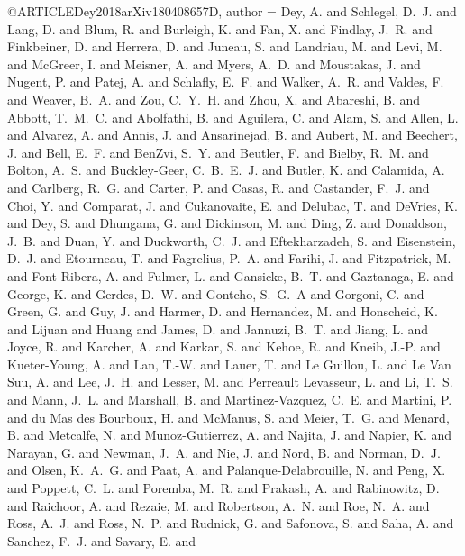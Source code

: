 \documentclass[twocolumn]{aastex62}
\begin{document}
{{{{{{{{{{{{{{{{{{{{{{{{{{{{{{{{{{{{{{{{{{{{{{{{{{{{@ARTICLE{Dey2018arXiv180408657D,
   author = {{Dey}, A. and {Schlegel}, D.~J. and {Lang}, D. and {Blum}, R. and 
	{Burleigh}, K. and {Fan}, X. and {Findlay}, J.~R. and {Finkbeiner}, D. and 
	{Herrera}, D. and {Juneau}, S. and {Landriau}, M. and {Levi}, M. and 
	{McGreer}, I. and {Meisner}, A. and {Myers}, A.~D. and {Moustakas}, J. and 
	{Nugent}, P. and {Patej}, A. and {Schlafly}, E.~F. and {Walker}, A.~R. and 
	{Valdes}, F. and {Weaver}, B.~A. and {Zou}, C.~Y.~H. and {Zhou}, X. and 
	{Abareshi}, B. and {Abbott}, T.~M.~C. and {Abolfathi}, B. and 
	{Aguilera}, C. and {Alam}, S. and {Allen}, L. and {Alvarez}, A. and 
	{Annis}, J. and {Ansarinejad}, B. and {Aubert}, M. and {Beechert}, J. and 
	{Bell}, E.~F. and {BenZvi}, S.~Y. and {Beutler}, F. and {Bielby}, R.~M. and 
	{Bolton}, A.~S. and {Buckley-Geer}, C.~B.~E.~J. and {Butler}, K. and 
	{Calamida}, A. and {Carlberg}, R.~G. and {Carter}, P. and {Casas}, R. and 
	{Castander}, F.~J. and {Choi}, Y. and {Comparat}, J. and {Cukanovaite}, E. and 
	{Delubac}, T. and {DeVries}, K. and {Dey}, S. and {Dhungana}, G. and 
	{Dickinson}, M. and {Ding}, Z. and {Donaldson}, J.~B. and {Duan}, Y. and 
	{Duckworth}, C.~J. and {Eftekharzadeh}, S. and {Eisenstein}, D.~J. and 
	{Etourneau}, T. and {Fagrelius}, P.~A. and {Farihi}, J. and 
	{Fitzpatrick}, M. and {Font-Ribera}, A. and {Fulmer}, L. and 
	{Gansicke}, B.~T. and {Gaztanaga}, E. and {George}, K. and {Gerdes}, D.~W. and 
	{Gontcho}, S.~G.~A and {Gorgoni}, C. and {Green}, G. and {Guy}, J. and 
	{Harmer}, D. and {Hernandez}, M. and {Honscheid}, K. and {Lijuan} and 
	{Huang} and {James}, D. and {Jannuzi}, B.~T. and {Jiang}, L. and 
	{Joyce}, R. and {Karcher}, A. and {Karkar}, S. and {Kehoe}, R. and 
	{Kneib}, J.-P. and {Kueter-Young}, A. and {Lan}, T.-W. and {Lauer}, T. and 
	{Le Guillou}, L. and {Le Van Suu}, A. and {Lee}, J.~H. and {Lesser}, M. and 
	{Perreault Levasseur}, L. and {Li}, T.~S. and {Mann}, J.~L. and 
	{Marshall}, B. and {Martinez-Vazquez}, C.~E. and {Martini}, P. and 
	{du Mas des Bourboux}, H. and {McManus}, S. and {Meier}, T.~G. and 
	{Menard}, B. and {Metcalfe}, N. and {Munoz-Gutierrez}, A. and 
	{Najita}, J. and {Napier}, K. and {Narayan}, G. and {Newman}, J.~A. and 
	{Nie}, J. and {Nord}, B. and {Norman}, D.~J. and {Olsen}, K.~A.~G. and 
	{Paat}, A. and {Palanque-Delabrouille}, N. and {Peng}, X. and 
	{Poppett}, C.~L. and {Poremba}, M.~R. and {Prakash}, A. and 
	{Rabinowitz}, D. and {Raichoor}, A. and {Rezaie}, M. and {Robertson}, A.~N. and 
	{Roe}, N.~A. and {Ross}, A.~J. and {Ross}, N.~P. and {Rudnick}, G. and 
	{Safonova}, S. and {Saha}, A. and {Sanchez}, F.~J. and {Savary}, E. and 
}}}}}}}}}}}}}}}}}}}}}}}}}}}}}}}}}}}}}}}}}}}}}}}}}}}}}}
\end{document}
